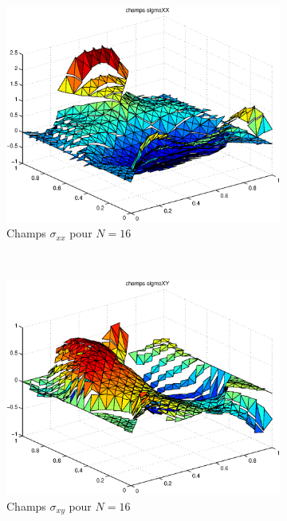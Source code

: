 \begin{figure}[h!]
\begin{subfigure}[b]{0.32\textwidth}
  \includegraphics[width=\textwidth]{images/sigmaxxN32.eps}
  \caption{Champs $\sigma_{xx}$ pour $N=16$}
  \end{subfigure}
  ~
  \begin{subfigure}[b]{0.32\textwidth}
  \includegraphics[width=\textwidth]{images/sigmaxyN32.eps}
  \caption{Champs $\sigma_{xy}$ pour $N=16$}
  \end{subfigure}
  ~
  \begin{subfigure}[b]{0.32\textwidth}

\end{subfigure}
\end{figure}
